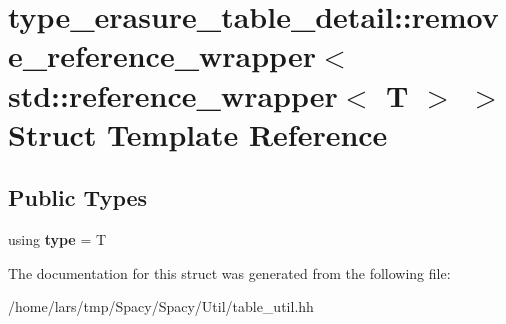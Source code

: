 \hypertarget{structtype__erasure__table__detail_1_1remove__reference__wrapper_3_01std_1_1reference__wrapper_3_01T_01_4_01_4}{}\section{type\+\_\+erasure\+\_\+table\+\_\+detail\+:\+:remove\+\_\+reference\+\_\+wrapper$<$ std\+:\+:reference\+\_\+wrapper$<$ T $>$ $>$ Struct Template Reference}
\label{structtype__erasure__table__detail_1_1remove__reference__wrapper_3_01std_1_1reference__wrapper_3_01T_01_4_01_4}
\subsection*{Public Types}
\begin{DoxyCompactItemize}
\item 
using {\bfseries type} = T\hypertarget{structtype__erasure__table__detail_1_1remove__reference__wrapper_3_01std_1_1reference__wrapper_3_01T_01_4_01_4_aacb7512e0e8dfeca348d6e1a295aa78a}{}\label{structtype__erasure__table__detail_1_1remove__reference__wrapper_3_01std_1_1reference__wrapper_3_01T_01_4_01_4_aacb7512e0e8dfeca348d6e1a295aa78a}

\end{DoxyCompactItemize}


The documentation for this struct was generated from the following file\+:\begin{DoxyCompactItemize}
\item 
/home/lars/tmp/\+Spacy/\+Spacy/\+Util/table\+\_\+util.\+hh\end{DoxyCompactItemize}
